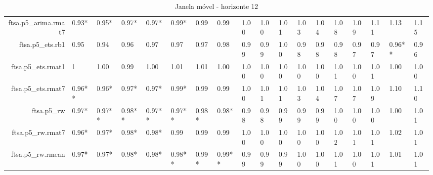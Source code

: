 \begin{table}[ht]
{\begin{tabular}{rlllllllllllllllll}
  ftsa.p5\_arima.rmat7 & 0.93* & 0.95* & 0.97* & 0.97* & 0.99* & 0.99 & 0.99 & 1.00 & 1.00 & 1.01 & 1.03 & 1.04 & 1.08 & 1.09 & 1.11 & 1.13 & 1.15 \\ 
  ftsa.p5\_ets.rb1 & 0.95 & 0.94 & 0.96 & 0.97 & 0.97 & 0.97 & 0.98 & 0.99 & 0.99 & 1.00 & 0.98 & 0.98 & 0.98 & 0.97 & 0.97 & 0.96** & 0.96 \\ 
  ftsa.p5\_ets.rmat1 & 1 & 1.00 & 0.99 & 1.00 & 1.01 & 1.01 & 1.00 & 1.00 & 1.00 & 1.00 & 1.00 & 1.00 & 1.01 & 1.00 & 1.01 & 1.00 & 1.00 \\ 
  ftsa.p5\_ets.rmat7 & 0.96** & 0.96* & 0.97* & 0.97* & 0.99* & 0.99 & 0.99 & 1.00 & 1.01 & 1.01 & 1.03 & 1.04 & 1.07 & 1.07 & 1.09 & 1.10 & 1.10 \\ 
  ftsa.p5\_rw & 0.97* & 0.97** & 0.98** & 0.97** & 0.97** & 0.98* & 0.98* & 0.98 & 0.98 & 0.99 & 0.99 & 0.99 & 1.00 & 1.00 & 1.00 & 1.00 & 1.01 \\ 
  ftsa.p5\_rw.rmat7 & 0.96* & 0.97* & 0.98* & 0.98* & 0.99 & 0.99 & 0.99 & 1.00 & 1.00 & 1.00 & 1.00 & 1.00 & 1.02 & 1.01 & 1.01 & 1.02 & 1.01 \\ 
  ftsa.p5\_rw.rmean & 0.97* & 0.97* & 0.98* & 0.98* & 0.98** & 0.99* & 0.99** & 0.99 & 0.99 & 0.99 & 1.00 & 1.00 & 1.01 & 1.00 & 1.01 & 1.01 & 1.01 \\ 
   \hline
\end{tabular}
}
\caption{Janela móvel - horizonte 12} 
\end{table}
